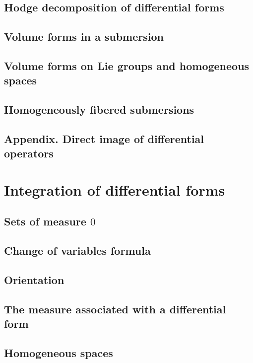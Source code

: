 \documentclass[a4paper]{article}
\begin{document}
\subsection{Hodge decomposition of differential forms}

\subsection{Volume forms in a submersion}

\subsection{Volume forms on Lie groups and homogeneous spaces}

\subsection{Homogeneously fibered submersions}

\subsection*{Appendix. Direct image of differential operators}

\section{Integration of differential forms}

\subsection{Sets of measure $0$}

\subsection{Change of variables formula}

\subsection{Orientation}

\subsection{The measure associated with a differential form}

\subsection{Homogeneous spaces}
\end{document}
